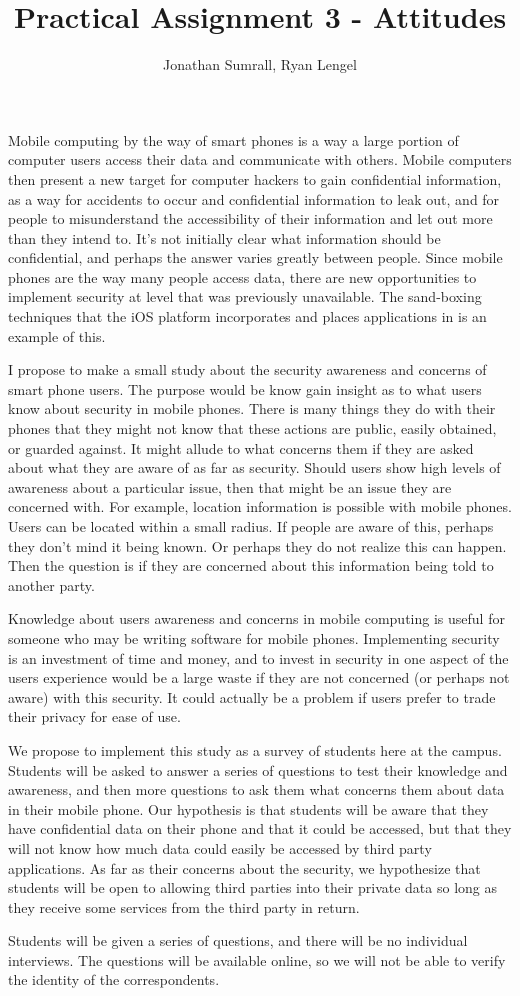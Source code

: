 \documentclass[]{apa}
\affiliation{1DV200}
\author{Jonathan Sumrall, Ryan Lengel}
\title{Practical Assignment 3 - Attitudes }
\begin{document}
\doublespace
\maketitle{}

Mobile computing by the way of smart phones is a way a large portion of computer users access their data and communicate with others. Mobile computers then present a new target for computer hackers to gain confidential information, as a way for accidents to occur and confidential information to leak out, and for people to misunderstand the accessibility of their information and let out more than they intend to. It's not initially clear what information should be confidential, and perhaps the answer varies greatly between people. Since mobile phones are the way many people access data, there are new opportunities to implement security at level that was previously unavailable. The sand-boxing techniques that the iOS platform incorporates and places applications in is an example of this. 

I propose to make a small study about the security awareness and concerns of smart phone users. The purpose would be know gain insight as to what users know about security in mobile phones. There is many things they do with their phones that they might not know that these actions are public, easily obtained, or guarded against. It might allude to what concerns them if they are asked about what they are aware of as far as security. Should users show high levels of awareness about a particular issue, then that might be an issue they are concerned with. For example, location information is possible with mobile phones. Users can be located within a small radius. If people are aware of this, perhaps they don't mind it being known. Or perhaps they do not realize this can happen. Then the question is if they are concerned about this information being told to another party. 

Knowledge about users awareness and concerns in mobile computing is useful for someone who may be writing software for mobile phones. Implementing security is an investment of time and money, and to invest in security in one aspect of the users experience would be a large waste if they are not concerned (or perhaps not aware) with this security. It could actually be a problem if users prefer to trade their privacy for ease of use. 

We propose to implement this study as a survey of students here at the campus. Students will be asked to answer a series of questions to test their knowledge and awareness, and then more questions to ask them what concerns them about data in their mobile phone. Our hypothesis is that students will be aware that they have confidential data on their phone and that it could be accessed, but that they will not know how much data could easily be accessed by third party applications. As far as their concerns about the security, we hypothesize that students will be open to allowing  third parties into their private data so long as they receive some services from the third party in return.

Students will be given a series of questions, and there will be no individual interviews. The questions will be available online, so we will not be able to verify the identity of the correspondents. 
\end{document}
